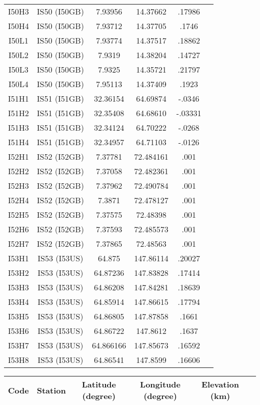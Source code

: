 \documentclass[a4paper, 10pt]{report}
\begin{document}
{\begin{center}
\begin{tabular}{|c|c|c|c|c|c|}
I50H3&	IS50 (I50GB)&	 	7.93956&	14.37662&	.17986\\
I50H4&	IS50 (I50GB)&	 	7.93712&	14.37705&	.1746\\
I50L1&	IS50 (I50GB)&	 	7.93774&	14.37517&	.18862\\
I50L2&	IS50 (I50GB)&	 	7.9319&	14.38204&	.14727\\
I50L3&	IS50 (I50GB)&	 	7.9325&	14.35721&	.21797\\
I50L4&	IS50 (I50GB)&	 	7.95113&	14.37409&	.1923\\
I51H1&	IS51 (I51GB)&	 	32.36154&	64.69874&	-.0346\\
I51H2&	IS51 (I51GB)&	 	32.35408&	64.68610&	-.03331\\
I51H3&	IS51 (I51GB)&	 	32.34124&	64.70222&	-.0268\\
I51H4&	IS51 (I51GB)&	 	32.34957&	64.71103&	-.0126\\
I52H1&	IS52 (I52GB)&	 	7.37781&	72.484161&	.001\\
I52H2&	IS52 (I52GB)&	 	7.37058&	72.482361&	.001\\
I52H3&	IS52 (I52GB)&	 	7.37962&	72.490784&	.001\\
I52H4&	IS52 (I52GB)&	 	7.3871&	72.478127&	.001\\
I52H5&	IS52 (I52GB)&	 	7.37575&	72.48398&	.001\\
I52H6&	IS52 (I52GB)&	 	7.37593&	72.485573&	.001\\
I52H7&	IS52 (I52GB)&	 	7.37865&	72.48563&	.001\\
I53H1&	IS53 (I53US)&	 	64.875&	147.86114&	.20027\\
I53H2&	IS53 (I53US)&	 	64.87236&	147.83828&	.17414\\
I53H3&	IS53 (I53US)&	 	64.86208&	147.84281&	.18639\\
I53H4&	IS53 (I53US)&	 	64.85914&	147.86615&	.17794\\
I53H5&	IS53 (I53US)&	 	64.86805&	147.87858&	.1661\\
I53H6&	IS53 (I53US)&	 	64.86722&	147.8612&	.1637\\
I53H7&	IS53 (I53US)&	 	64.866166&	147.85673&	.16592\\
I53H8&	IS53 (I53US)&	 	64.86541&	147.8599&	.16606\\



\hline
\end{tabular}
\end{center}
\begin{center}
\begin{tabular}{|c|c|c|c|c|c|}
\hline
Code&	Station&	Latitude (degree)&	Longitude (degree)&	Elevation (km)\\
\hline


\end{tabular}
\end{center}}
\end{document}
